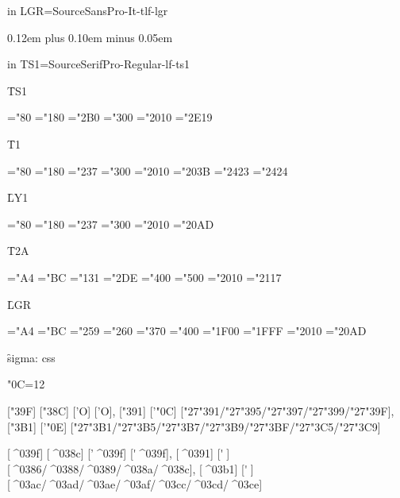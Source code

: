 \TextH

\font in LGR\LgrZZZSansItalic=SourceSansPro-It-tlf-lgr
\LgrZZZSansItalic
\TextG

\TextH


\vfil
\eject
\spaceskip 0.12em plus 0.10em minus 0.05em

\font in TS1\TSoneZZZSerifRegular=SourceSerifPro-Regular-lf-ts1

{\f TS1}

\TSoneZZZSerifRegular
\ChrA="80 \ChrB="180
\PrintCode
\ChrA="2B0 \ChrB="300
\PrintCode
\ChrA="2010 \ChrB="2E19
\PrintCode

{\f T1}

\ToneZZZSerifRegular
\ChrA="80 \ChrB="180
\PrintCode
\ChrA="237 \ChrB="300
\PrintCode
\ChrA="2010 \ChrB="203B
\PrintCode
\ChrA="2423 \ChrB="2424
\PrintCode

{\f LY1}

\LYoneZZZSerifRegular
\ChrA="80 \ChrB="180
\PrintCode
\ChrA="237 \ChrB="300
\PrintCode
\ChrA="2010 \ChrB="20AD
\PrintCode

{\f T2A}

\TtwoaZZZCodeRegular
\ChrA="A4 \ChrB="BC
\PrintCode
\ChrA="131 \ChrB="2DE
\PrintCode
\ChrA="400 \ChrB="500
\PrintCode
\ChrA="2010 \ChrB="2117
\PrintCode

{\f LGR}

\LgrZZZSansRegular
\ChrA="A4 \ChrB="BC
\PrintCode
\ChrA="259 \ChrB="260
\PrintCode
\ChrA="370 \ChrB="400
\PrintCode
\ChrA="1F00 \ChrB="1FFF
\PrintCode
\ChrA="2010 \ChrB="20AD
\PrintCode

{\f sigma:} ^^63^^73^^73

\catcode"0C=12

[\char"39F] [\char"38C] ['\relax Ο] ['Ο],
[\char"391] ['\char"0C] [\char"27\char"391/\char"27\char"395/\char"27\char"397/\char"27\char"399/\char"27\char"39F],
[\char"3B1] ['\char"0E] [\char"27\char"3B1/\char"27\char"3B5/\char"27\char"3B7/\char"27\char"3B9/\char"27\char"3BF/\char"27\char"3C5/\char"27\char"3C9]

[^^^^039f] [^^^^038c] ['\relax ^^^^039f] [^^27^^^^039f],
[^^^^0391] [^^27^^0c] [^^^^0386/^^^^0388/^^^^0389/^^^^038a/^^^^038c],
[^^^^03b1] [^^27^^0e] [^^^^03ac/^^^^03ad/^^^^03ae/^^^^03af/^^^^03cc/^^^^03cd/^^^^03ce]

\bye
